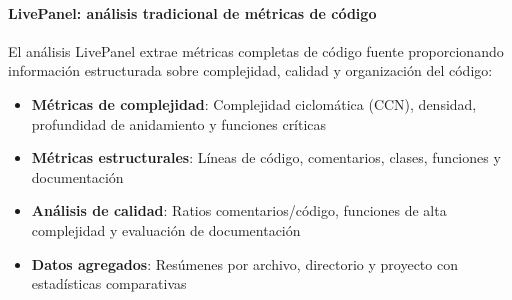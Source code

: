 \documentclass[a4paper, 12pt]{book}
\begin{document}
\paragraph{LivePanel: análisis tradicional de métricas de código}
El análisis LivePanel extrae métricas completas de código fuente proporcionando información estructurada sobre complejidad, calidad y organización del código:

\begin{itemize}
  \item \textbf{Métricas de complejidad}: Complejidad ciclomática (CCN), densidad, profundidad de anidamiento y funciones críticas
  \item \textbf{Métricas estructurales}: Líneas de código, comentarios, clases, funciones y documentación
  \item \textbf{Análisis de calidad}: Ratios comentarios/código, funciones de alta complejidad y evaluación de documentación
  \item \textbf{Datos agregados}: Resúmenes por archivo, directorio y proyecto con estadísticas comparativas
\end{itemize}
\end{document}
